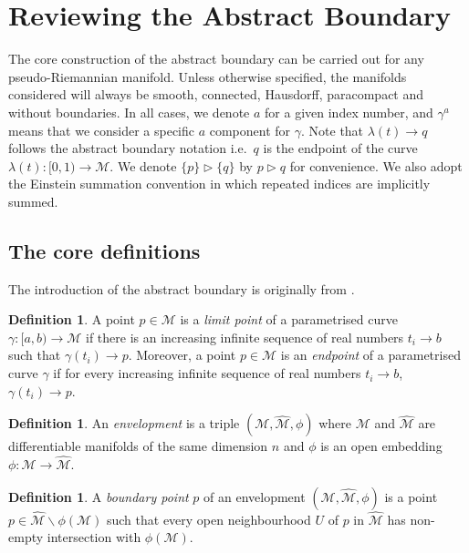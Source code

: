 \documentclass[pdflatex,sn-mathphys-num]{sn-jnl}
\theoremstyle{definition}
\newtheorem{defn}[theorem]{Definition}
\begin{document}
\section{Reviewing the Abstract Boundary}\label{section 2}
The core construction of the abstract boundary can be carried out for any pseudo-Riemannian manifold. Unless otherwise specified, the manifolds considered will always be smooth, connected, Hausdorff, paracompact and without boundaries. In all cases, we denote $a$ for a given index number, and $\gamma^a$ means that we consider a specific $a$ component for $\gamma$. Note that $\lambda(t) \rightarrow q$ follows the abstract boundary notation i.e.\ $q$ is the endpoint of the curve $\lambda(t): [0,1) \rightarrow \mathcal{M}$. We denote $\{p\} \vartriangleright \{q\}$ by $p \vartriangleright q$ for convenience. We also adopt the Einstein summation convention in which repeated indices are implicitly summed.

\subsection{The core definitions}
The introduction of the abstract boundary is originally from \cite{scott1994abstract}.
\begin{defn}
A point $p \in \mathcal{M}$ is a \textit{limit point} of a parametrised curve $\gamma: [a,b) \rightarrow \mathcal{M}$ if there is an increasing infinite sequence of real numbers $t_i \rightarrow b$ such that $\gamma(t_i) \rightarrow p$. Moreover, a point $p \in \mathcal{M}$ is an \textit{endpoint} of a parametrised curve $\gamma$ if for every increasing infinite sequence of real numbers $t_i \rightarrow b$, $\gamma(t_i) \rightarrow p$.
\end{defn}

\begin{defn}
An \textit{envelopment} is a triple $(\mathcal{M},\mathcal{\hat{M}},\phi)$ where $\mathcal{M}$ and $\mathcal{\hat{M}}$ are differentiable manifolds of the same dimension $n$ and $\phi$ is an open embedding $\phi: \mathcal{M} \rightarrow \mathcal{\hat{M}}$.
\end{defn}

\begin{defn}
    A \textit{boundary point} $p$ of an envelopment $(\mathcal{M},\mathcal{\hat{M}},\phi)$ is a point $p \in \mathcal{\hat{M}}\backslash\phi(\mathcal{M})$ such that every open neighbourhood $U$ of $p$ in $\mathcal{\hat{M}}$ has non-empty intersection with $\phi(\mathcal{M})$.
\end{defn}
\end{document}
